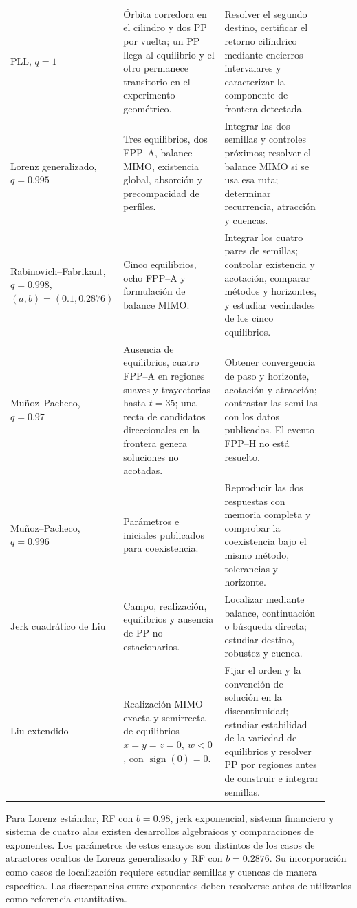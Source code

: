 \begin{longtable}{@{}L{0.24\linewidth}L{0.32\linewidth}L{0.36\linewidth}@{}}
PLL, \(q=1\)
& Órbita corredora en el cilindro y dos PP por vuelta; un PP llega al
equilibrio y el otro permanece transitorio en el experimento geométrico.
& Resolver el segundo destino, certificar el retorno cilíndrico mediante
encierros intervalares y caracterizar la componente de frontera detectada.\\
Lorenz generalizado, \(q=0.995\)
& Tres equilibrios, dos FPP--A, balance MIMO, existencia global, absorción y
precompacidad de perfiles.
& Integrar las dos semillas y controles próximos; resolver el balance MIMO si
se usa esa ruta; determinar recurrencia, atracción y cuencas.\\
Rabinovich--Fabrikant, \(q=0.998\), \((a,b)=(0.1,0.2876)\)
& Cinco equilibrios, ocho FPP--A y formulación de balance MIMO.
& Integrar los cuatro pares de semillas; controlar existencia y acotación,
comparar métodos y horizontes, y estudiar vecindades de los cinco equilibrios.\\
Muñoz--Pacheco, \(q=0.97\)
& Ausencia de equilibrios, cuatro FPP--A en regiones suaves y trayectorias
hasta \(t=35\); una recta de candidatos direccionales en la frontera genera
soluciones no acotadas.
& Obtener convergencia de paso y horizonte, acotación y atracción; contrastar
las semillas con los datos publicados. El evento FPP--H no está resuelto.\\
Muñoz--Pacheco, \(q=0.996\)
& Parámetros e iniciales publicados para coexistencia.
& Reproducir las dos respuestas con memoria completa y comprobar la
coexistencia bajo el mismo método, tolerancias y horizonte.\\
Jerk cuadrático de Liu
& Campo, realización, equilibrios y ausencia de PP no estacionarios.
& Localizar mediante balance, continuación o búsqueda directa; estudiar
destino, robustez y cuenca.\\
Liu extendido
& Realización MIMO exacta y semirrecta de equilibrios
\(x=y=z=0,\ w<0\), con \(\operatorname{sign}(0)=0\).
& Fijar el orden y la convención de solución en la discontinuidad; estudiar
estabilidad de la variedad de equilibrios y resolver PP por regiones antes
de construir e integrar semillas.\\
\bottomrule
\end{longtable}

Para Lorenz estándar, RF con \(b=0.98\), jerk exponencial, sistema financiero
y sistema de cuatro alas existen desarrollos algebraicos y comparaciones de
exponentes. Los parámetros de estos ensayos son distintos de los casos de
atractores ocultos de Lorenz generalizado y RF con \(b=0.2876\).
Su incorporación como casos de localización requiere estudiar semillas y
cuencas de manera específica. Las discrepancias entre exponentes deben
resolverse antes de utilizarlos como referencia cuantitativa.

